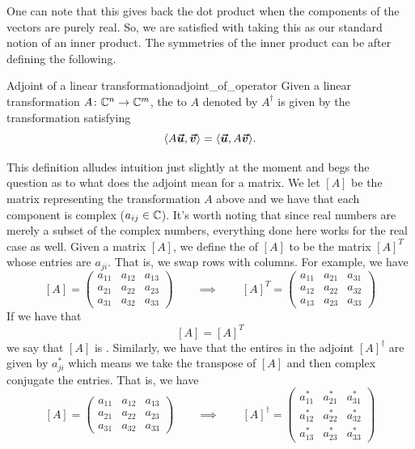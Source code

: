            One can note that this gives back the dot product when the components of the vectors are purely real.  So, we are satisfied with taking this as our standard notion of an inner product. The symmetries of the inner product can be after defining the following.

             \begin{df}{Adjoint of a linear transformation}{adjoint_of_operator}
                Given a linear transformation $A \colon \mathbb{C}^n \to \mathbb{C}^m$, the  to $A$ denoted by $A^\dagger$ is given by the transformation satisfying
                \[
                    \langle A\boldsymbol{\boldsymbol{\vec{u}}},\boldsymbol{\boldsymbol{\vec{v}}} \rangle = \langle \boldsymbol{\boldsymbol{\vec{u}}}, A\boldsymbol{\boldsymbol{\vec{v}}}\rangle.
                \]
            \end{df}
            
            This definition alludes intuition just slightly at the moment and begs the question as to what does the adjoint mean for a matrix.  We let $[A]$ be the matrix representing the transformation $A$ above and we have that each component is complex ($a_{ij}\in \mathbb{C}$). It's worth noting that since real numbers are merely a subset of the complex numbers, everything done here works for the real case as well.  Given a matrix $[A]$, we define the  of $[A]$   to be the matrix $[A]^T$ whose entries are $a_{ji}$. That is, we swap rows with columns.  For example, we have
            \[
            [A] = \begin{pmatrix} a_{11} & a_{12} & a_{13} \\ a_{21} & a_{22} & a_{23} \\ a_{31} & a_{32} & a_{33} \end{pmatrix} \qquad \implies \qquad [A]^T = \begin{pmatrix} a_{11} & a_{21} & a_{31} \\ a_{12} & a_{22} & a_{32} \\ a_{13} & a_{23} & a_{33} \end{pmatrix} 
            \]
            If we have that
            \[
            [A]=[A]^T
            \]
            we say that $[A]$ is . Similarly, we have that the entires in the adjoint $[A]^\dagger$ are given by $a_{ji}^*$ which means we take the transpose of $[A]$ and then complex conjugate the entries. That is, we have
            \[
                [A] = \begin{pmatrix} a_{11} & a_{12} & a_{13} \\ a_{21} & a_{22} & a_{23} \\ a_{31} & a_{32} & a_{33} \end{pmatrix} \qquad \implies \qquad [A]^\dagger = \begin{pmatrix} a_{11}^* & a_{21}^* & a_{31}^* \\ a_{12}^* & a_{22}^* & a_{32}^* \\ a_{13}^* & a_{23}^* & a_{33}^* \end{pmatrix}
            \]

